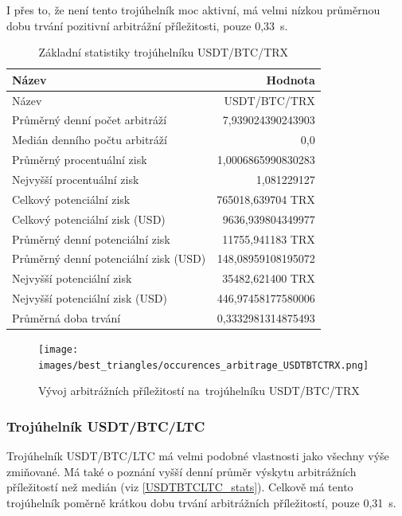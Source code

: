 \documentclass[thesis=B,czech]{FITthesis}[2019/03/21]
\begin{document}
I přes to, že není tento trojúhelník moc aktivní, má velmi nízkou průměrnou dobu trvání pozitivní arbitrážní příležitosti, pouze 0,33~s. 

\begin{table}\centering
\caption{Základní statistiky trojúhelníku USDT/BTC/TRX}
\label{USDTBTCTRX_stats}
\begin{tabular}{|| l | r ||}
\hline Název & Hodnota \\ 
\hline\hline Název & USDT/BTC/TRX \\ 
\hline Průměrný denní počet arbitráží & 7,939024390243903 \\ 
\hline Medián denního počtu arbitráží & 0,0 \\ 
\hline Průměrný procentuální zisk & 1,0006865990830283 \\ 
\hline Nejvyšší procentuální zisk & 1,081229127 \\ 
\hline Celkový potenciální zisk & 765018,639704 TRX \\ 
\hline Celkový potenciální zisk (USD) & 9636,939804349977 \\ 
\hline Průměrný denní potenciální zisk & 11755,941183 TRX \\ 
\hline Průměrný denní potenciální zisk (USD) & 148,08959108195072 \\ 
\hline Nejvyšší potenciální zisk & 35482,621400 TRX \\ 
\hline Nejvyšší potenciální zisk (USD) & 446,97458177580006 \\ 
\hline Průměrná doba trvání & 0,3332981314875493 \\ 
\hline
\end{tabular}
\end{table}

\begin{figure}\centering
	\texttt{[image: images/best\_triangles/occurences\_arbitrage\_USDTBTCTRX.png]}
	\caption{Vývoj arbitrážních příležitostí na~trojúhelníku USDT/BTC/TRX }\label{occurences_arbitrage_USDTBTCTRX}
\end{figure}



\subsubsection{Trojúhelník USDT/BTC/LTC}
Trojúhelník USDT/BTC/LTC má velmi podobné vlastnosti jako všechny výše zmiňované. Má také o poznání vyšší denní průměr výskytu arbitrážních \linebreak příležitostí než medián (viz \ref{USDTBTCLTC_stats}). Celkově má tento trojúhelník poměrně krátkou dobu trvání arbitrážních příležitostí, pouze 0,31~s. 
\end{document}
